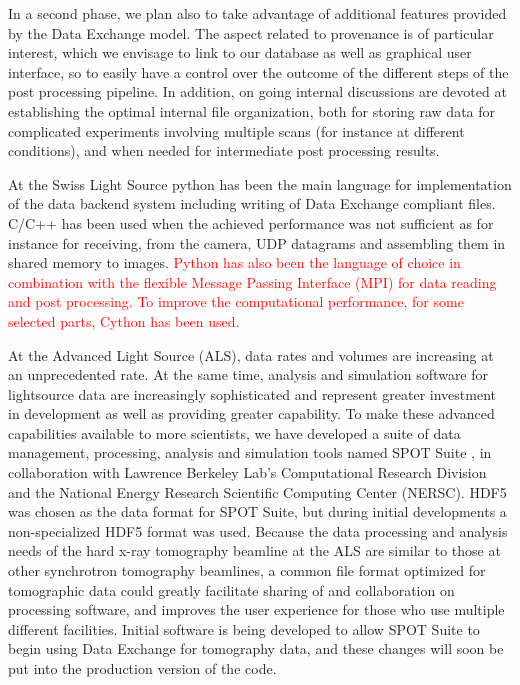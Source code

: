 \documentclass[pdf]{iucr}              %
\begin{document}
In a second phase, we plan also to take advantage of additional features provided by the Data Exchange model. The aspect related to provenance is of particular interest, which we envisage to link to our database as well as graphical user interface, so to easily have a control over the outcome of the different steps of the post processing pipeline. In addition, on going internal discussions are devoted at establishing the optimal internal file organization, both for storing raw data for complicated experiments involving multiple scans (for instance at different conditions), and when needed for intermediate post processing results.

At the Swiss Light Source python has been the main language for implementation of the data backend system including writing of Data Exchange compliant files. C/C++ has been used when the achieved performance was not sufficient as for instance for receiving, from the camera, UDP datagrams and assembling them in shared memory to images. \textcolor{red}{ Python has also been the language of choice in combination with the flexible Message Passing Interface (MPI) for data reading and post processing. To improve the computational performance, for some selected parts, Cython has been used.}

At the Advanced Light Source (ALS), data rates and volumes are increasing at an unprecedented rate. At the same time, analysis and simulation software for lightsource data are increasingly sophisticated and represent greater investment in development as well as providing greater capability. To make these advanced capabilities available to more scientists, we have developed a suite of data management, processing, analysis and simulation tools named SPOT Suite \cite{Spot_suite}, in collaboration with Lawrence Berkeley Lab's Computational Research Division and the National Energy Research Scientific Computing Center (NERSC). HDF5 was chosen as the data format for SPOT Suite, but during initial developments a non-specialized HDF5 format was used. Because the data processing and analysis needs of the hard x-ray tomography beamline at the ALS are similar to those at other synchrotron tomography beamlines, a common file format optimized for tomographic data could greatly facilitate sharing of and collaboration on processing software, and improves the user experience for those who use multiple different facilities. Initial software is being developed to allow SPOT Suite to begin using Data Exchange for tomography data, and these changes will soon be put into the production version of the code.
\end{document}
